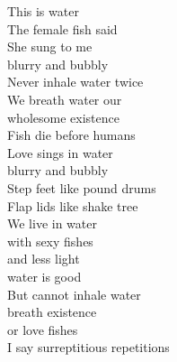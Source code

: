 This is water\\
The female fish said\\
She sung to me\\
blurry and bubbly\\

Never inhale water twice\\
We breath water our\\
wholesome existence\\
Fish die before humans\\

Love sings in water\\
blurry and bubbly\\
Step feet like pound drums\\
Flap lids like shake tree\\

We live in water\\
with sexy fishes\\
and less light\\
water is good\\

But cannot inhale water\\
breath existence\\
or love fishes\\
I say surreptitious repetitions\\

